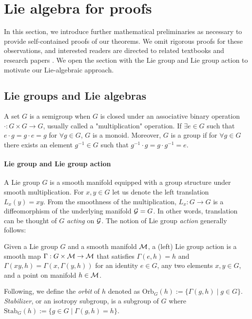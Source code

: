 \section{Lie algebra for proofs}
\label{app:LieAlgebra}
In this section, we introduce further mathematical preliminaries
as necessary to provide self-contained proofs of our theorems.
We omit rigorous proofs for these observations,
and interested readers are directed to related textbooks and research papers \cite{iserles2000lie,lee2003smooth, petrogradsky2007wreath, tu2008manifold, rotman2009introduction, hall2013lie, robbin2022introduction,liu2022transformers}.
We open the section with the Lie group and Lie group action to motivate our Lie-algebraic approach.
\subsection{Lie groups and Lie algebras}
\label{app:subsubsec_Lieintro}
A set $G$ is a semigroup when $G$ is closed under an associative binary operation $\cdot: G \times G \to G$, usually called a "multiplication" operation.
If $\exists e \in G$ such that $e \cdot g = g \cdot e = g$ for $\forall g \in G$, $G$ is a monoid.
Moreover, $G$ is a group if for $\forall g \in G$ there exists an element $g^{-1} \in G$ such that $g^{-1} \cdot g = g \cdot g^{-1} = e$.
\paragraph{Lie group and Lie group action}
A Lie group $G$ is a smooth manifold equipped with a group structure under smooth multiplication.
For $x,y \in G$ let us denote the left translation $L_x(y) = xy$.
From the smoothness of the multiplication,
$L_x: G \to G$ is a diffeomorphism of the underlying manifold $\mathcal{G}=G$.
In other words, translation can be thought of $G$ \emph{acting} on $\mathcal{G}$.
The notion of Lie group \emph{action} generally follows:
\begin{definition}
\label{app:def_LieGroupAction}
    Given a Lie group $G$ and a smooth manifold $\mathcal{M}$,
    a (left) Lie group action is a smooth map
    $\Gamma: G \times \mathcal{M} \to \mathcal{M}$ that satisfies
    $\Gamma(e,h) = h$ and $\Gamma(xy,h) = \Gamma(x, \Gamma(y,h))$
    for an identity $e \in G$, any two elements $x, y \in G$,
    and a point on manifold $h \in \mathcal{M}$.
\end{definition}
Following, we define the \emph{orbit} of $h$ denoted as $\text{Orb}_G(h) := \{\Gamma(g,h) \mid g \in G\}$.
\emph{Stabilizer}, or an isotropy subgroup, is a subgroup of $G$ where $\text{Stab}_G(h):= \{g\in G \mid \Gamma(g,h) = h \}$.


